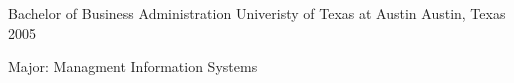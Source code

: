 

\begin{cventries}
  \cventry
    {Bachelor of Business Administration} %
    {Univeristy of Texas at Austin} %
    {Austin, Texas} %
    {2005} %
    {
      \begin{cvitems} %
        \item {Major: Managment Information Systems}
      \end{cvitems}
    }
    { } %

\end{cventries}
